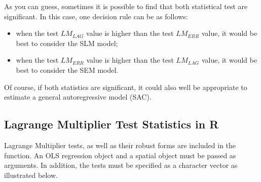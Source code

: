 \documentclass[english,12pt]{book}\usepackage[]{graphicx}\usepackage[]{xcolor}
\begin{document}
As you can guess, sometimes it is possible to find that both statistical test are significant. In this case, one decision rule can be as follows:

\begin{itemize}
  \item when the test $LM_{LAG}$ value is higher than the test $LM_{ERR}$ value, it would be best to consider the SLM model;
  \item when the test $LM_{ERR}$ value is higher than the test $LM_{LAG}$ value, it would be best to consider the SEM model. 
\end{itemize}

Of course, if both statistics are significant, it could also well be appropriate to estimate a general autoregressive model (SAC).

\subsection{Lagrange Multiplier Test Statistics in R}


Lagrange Multiplier tests, as well as their robust forms are included in the  function. An OLS regression object and a spatial  object must be passed as arguments. In addition, the tests must be specified as a character vector as illustrated below.
\end{document}
